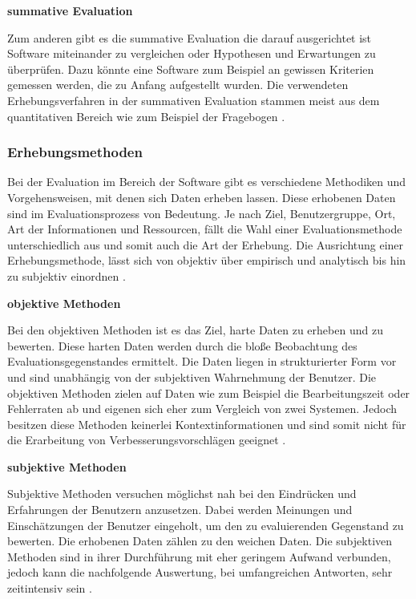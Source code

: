\textbf{summative Evaluation}

Zum anderen gibt es die summative Evaluation die darauf ausgerichtet ist Software miteinander zu vergleichen oder Hypothesen und Erwartungen zu überprüfen. Dazu könnte eine Software zum Beispiel an gewissen Kriterien gemessen werden, die zu Anfang aufgestellt wurden. Die verwendeten Erhebungsverfahren in der summativen Evaluation stammen meist aus dem quantitativen Bereich wie zum Beispiel der Fragebogen \citep[vgl.][8]{Hegner2003}.

\subsubsection{Erhebungsmethoden}
\label{sec:erhebungsmethoden}
Bei der Evaluation im Bereich der Software gibt es verschiedene Methodiken und Vorgehensweisen, mit denen sich Daten erheben lassen. Diese erhobenen Daten sind im Evaluationsprozess von Bedeutung. Je nach Ziel, Benutzergruppe, Ort, Art der Informationen und Ressourcen, fällt die Wahl einer Evaluationsmethode unterschiedlich aus \citep[vgl.][10]{Hegner2003} und somit auch die Art der Erhebung. Die Ausrichtung einer Erhebungsmethode, lässt sich von objektiv über empirisch und analytisch bis hin zu subjektiv einordnen \citep[vgl.][15]{Hegner2003}.

\textbf{objektive Methoden}

Bei den objektiven Methoden ist es das Ziel, \glqq harte \grqq{} Daten zu erheben und zu bewerten. Diese harten Daten werden durch die bloße Beobachtung des Evaluationsgegenstandes ermittelt. Die Daten liegen in strukturierter Form vor und sind unabhängig von der subjektiven Wahrnehmung der Benutzer. Die objektiven Methoden zielen auf Daten wie zum Beispiel die Bearbeitungszeit oder Fehlerraten ab und eigenen sich eher zum Vergleich von zwei Systemen. Jedoch besitzen diese Methoden keinerlei Kontextinformationen und sind somit nicht für die Erarbeitung von Verbesserungsvorschlägen geeignet \citep[vgl.][17]{Hegner2003}.

\textbf{subjektive Methoden}

Subjektive Methoden versuchen möglichst nah bei den Eindrücken und Erfahrungen der Benutzern anzusetzen. Dabei werden Meinungen und Einschätzungen der Benutzer eingeholt, um den zu evaluierenden Gegenstand zu bewerten. Die erhobenen Daten zählen zu den \glqq weichen \grqq{} Daten. Die subjektiven Methoden sind in ihrer Durchführung mit eher geringem Aufwand verbunden, jedoch kann die nachfolgende Auswertung, bei umfangreichen Antworten, sehr zeitintensiv sein \citep[vgl.][18]{Hegner2003}.

